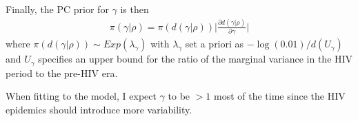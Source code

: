\documentclass[12pt,a4paper]{article}
\begin{document}
 Finally, the PC prior for $\gamma$ is then
\begin{align*}
\pi(\gamma | \rho) = \pi(d(\gamma | \rho)) \Big\vert \frac{\partial d(\gamma | \rho)}{\partial \gamma} \Big\vert
\end{align*}
where $\pi(d(\gamma | \rho)) \sim Exp (\lambda_{\gamma})$ with $\lambda_{\gamma}$ set a priori as $-\log(0.01) / d(U_{\gamma})$ and $U_{\gamma}$ specifies an upper bound for the ratio of the marginal variance in the HIV period to the pre-HIV era.

When fitting to the model, I expect $\gamma$ to be $ > 1 $ most of the time since the HIV epidemics should introduce more variability.
\end{document}
